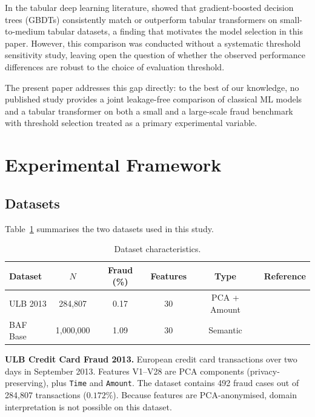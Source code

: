 \documentclass[a4paper,fleqn]{cas-sc}
\begin{document}
In the tabular deep learning literature, \citet{shwartzziv2022tabular} showed that
gradient-boosted decision trees (GBDTs) consistently match or outperform tabular
transformers on small-to-medium tabular datasets, a finding that motivates the model
selection in this paper.
However, this comparison was conducted without a systematic threshold sensitivity study,
leaving open the question of whether the observed performance differences are robust to
the choice of evaluation threshold.

The present paper addresses this gap directly: to the best of our knowledge, no
published study provides a joint leakage-free comparison of classical ML models and a
tabular transformer on both a small and a large-scale fraud benchmark with threshold
selection treated as a primary experimental variable.

\section{Experimental Framework}
\label{sec:framework}

\subsection{Datasets}
\label{subsec:datasets}

Table~\ref{tab:data_chars} summarises the two datasets used in this study.

\begin{table}[ht!]
\centering
\caption{Dataset characteristics.}
\label{tab:data_chars}
\begin{tabular}{l c c c c l}
\toprule
Dataset & $N$ & Fraud (\%) & Features & Type & Reference \\
\midrule
ULB 2013 & 284,807 & 0.17 & 30 & PCA + Amount & \citet{dalpozzolo2017realistic} \\
BAF Base & 1,000,000 & 1.09 & 30 & Semantic & \citet{jesus2022turning} \\
\bottomrule
\end{tabular}
\end{table}

\textbf{ULB Credit Card Fraud 2013.}
European credit card transactions over two days in September 2013.
Features V1--V28 are PCA components (privacy-preserving), plus \texttt{Time} and
\texttt{Amount}.
The dataset contains 492 fraud cases out of 284,807 transactions ($0.172\%$).
Because features are PCA-anonymised, domain interpretation is not possible on this dataset.
\end{document}
